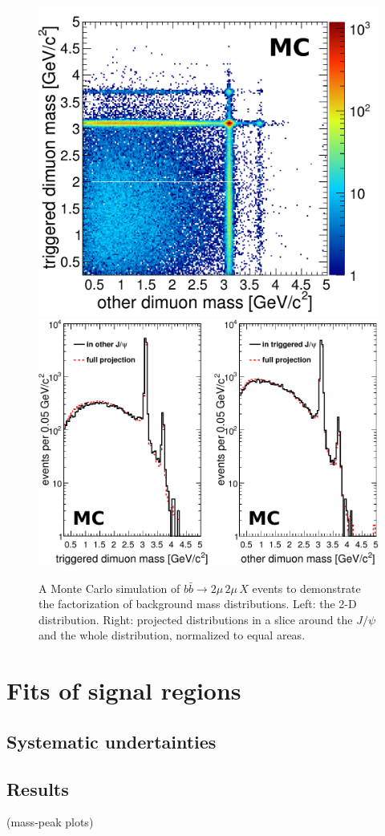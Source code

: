 \documentclass[12pt]{cms-tdr}
\begin{document}
\begin{figure}
\includegraphics[height=6.2 cm]{PLOTS/mc_dimudimu_wholecontrol.pdf} \hfill
\includegraphics[height=6 cm]{PLOTS/mc_wholecontrolregions_factorize.pdf}

\caption{A Monte Carlo simulation of $b\bar{b} \to 2\mu \, 2\mu \, X$
  events to demonstrate the factorization of background mass
  distributions.  Left: the 2-D distribution.  Right: projected
  distributions in a slice around the $J/\psi$ and the whole
  distribution, normalized to equal areas. \label{fig:mc_dimudimu_wholecontrol}}
\end{figure}

\section{Fits of signal regions}

\subsection{Systematic undertainties}

\subsection{Results}

(mass-peak plots)
\end{document}
